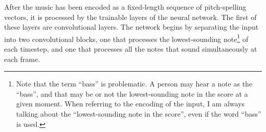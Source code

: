 
After the music has been encoded as a fixed-length sequence
of pitch-spelling vectors, it is processed by the trainable
layers of the neural network. The first of these layers are
convolutional layers. The network begins by separating the
input into two convolutional blocks, one that processes the
lowest-sounding note\footnote{Note that the term ``bass'' is
problematic. A person may hear a note as the ``bass'', and
that may be or not the lowest-sounding note in the score at
a given moment. When referring to the encoding of the input,
I am always talking about the ``lowest-sounding note in the
score'', even if the word ``bass'' is used.} of each
timestep, and one that processes all the notes that sound
simultaneously at each frame.
